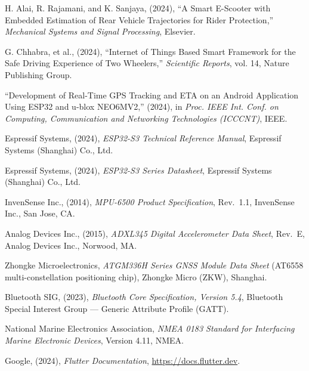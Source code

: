 \documentclass[12pt,a4paper,oneside]{report}
\begin{document}
\begin{singlespace}
\begin{enumerate}[label={[\arabic*]},leftmargin=*,itemsep=0.85em,topsep=0.5em]

\item H. Alai, R. Rajamani, and K. Sanjaya, (2024), ``A Smart E-Scooter with Embedded
Estimation of Rear Vehicle Trajectories for Rider Protection,'' \textit{Mechanical Systems
and Signal Processing}, Elsevier.

\item G. Chhabra, et al., (2024), ``Internet of Things Based Smart Framework for the Safe
Driving Experience of Two Wheelers,'' \textit{Scientific Reports}, vol. 14, Nature
Publishing Group.

\item ``Development of Real-Time GPS Tracking and ETA on an Android Application Using ESP32
and u-blox NEO6MV2,'' (2024), in \textit{Proc. IEEE Int. Conf. on Computing, Communication
and Networking Technologies (ICCCNT)}, IEEE.

\item Espressif Systems, (2024), \textit{ESP32-S3 Technical Reference Manual}, Espressif
Systems (Shanghai) Co., Ltd.

\item Espressif Systems, (2024), \textit{ESP32-S3 Series Datasheet}, Espressif Systems
(Shanghai) Co., Ltd.

\item InvenSense Inc., (2014), \textit{MPU-6500 Product Specification}, Rev.~1.1, InvenSense
Inc., San Jose, CA.

\item Analog Devices Inc., (2015), \textit{ADXL345 Digital Accelerometer Data Sheet},
Rev.~E, Analog Devices Inc., Norwood, MA.

\item Zhongke Microelectronics, \textit{ATGM336H Series GNSS Module Data Sheet} (AT6558
multi-constellation positioning chip), Zhongke Micro (ZKW), Shanghai.

\item Bluetooth SIG, (2023), \textit{Bluetooth Core Specification, Version 5.4}, Bluetooth
Special Interest Group --- Generic Attribute Profile (GATT).

\item National Marine Electronics Association, \textit{NMEA 0183 Standard for Interfacing
Marine Electronic Devices}, Version 4.11, NMEA.

\item Google, (2024), \textit{Flutter Documentation}, \url{https://docs.flutter.dev}.


\end{enumerate}
\end{singlespace}
\end{document}

